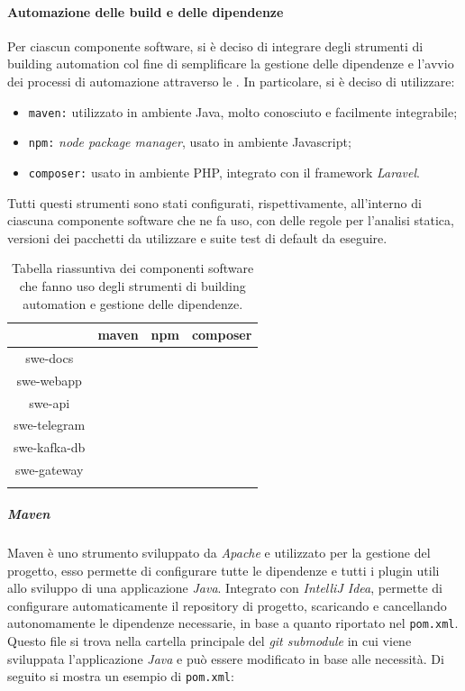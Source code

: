 	\paragraph{Automazione delle build e delle dipendenze}

	Per ciascun componente software, si è deciso di integrare degli strumenti di building automation col fine di semplificare la gestione delle dipendenze e l'avvio dei processi di automazione attraverso le .
	\newline
	In particolare, si è deciso di utilizzare:
	\begin{itemize}
		\item \verb!maven:! utilizzato in ambiente Java, molto conosciuto e facilmente integrabile;
		\item \verb!npm:! \textit{node package manager}, usato in ambiente Javascript;
		\item \verb!composer:! usato in ambiente PHP, integrato con il framework \textit{Laravel}.
	\end{itemize}

	Tutti questi strumenti sono stati configurati, rispettivamente, all'interno di ciascuna componente software che ne fa uso, con delle regole per l'analisi statica, versioni dei pacchetti da utilizzare e suite test di default da eseguire.	

	\begin{center}
		\begin{longtable}{|c|c|c|c|}
		\hline
		\rowcolor{lighter-grayer}
		 & \textbf{maven} & \textbf{npm} & \textbf{composer} \\
		\hline
		\endfirsthead
		swe-docs & & &  \\ \hline
		swe-webapp & & \checkmark & \checkmark  \\ \hline
		swe-api & \checkmark & &  \\ \hline
		swe-telegram & & \checkmark &  \\ \hline
		swe-kafka-db & \checkmark & &  \\ \hline
		swe-gateway & \checkmark & &  \\
		\hline
		\caption{Tabella riassuntiva dei componenti software che fanno uso degli strumenti di building automation e gestione delle dipendenze.}
		\end{longtable}
	\end{center}

		\subparagraph{Maven} 	

		Maven è uno strumento sviluppato da \textit{Apache} e utilizzato per la gestione del progetto, esso permette di configurare tutte le dipendenze e tutti i plugin utili allo sviluppo di una applicazione \textit{Java}.
		\newline
		Integrato con \textit{IntelliJ Idea}, permette di configurare automaticamente il repository di progetto, scaricando e cancellando autonomamente le dipendenze necessarie, in base a quanto riportato nel \verb!pom.xml!.
		\newline
		Questo file si trova nella cartella principale del \textit{git submodule} in cui viene sviluppata l'applicazione \textit{Java} e può essere modificato in base alle necessità. Di seguito si mostra un esempio di \verb!pom.xml!:

